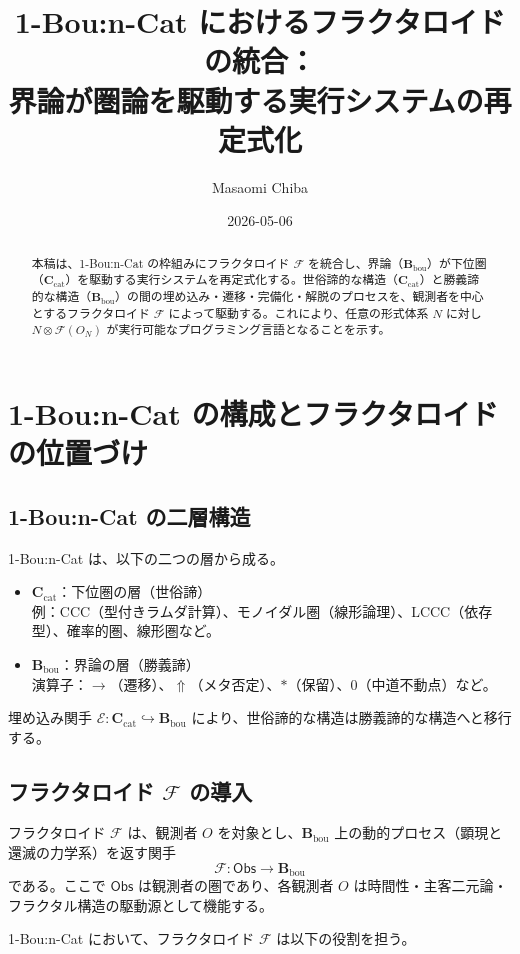 \documentclass[11pt]{article}
\title{1-Bou:n-Cat におけるフラクタロイドの統合：\\
界論が圏論を駆動する実行システムの再定式化}
\author{Masaomi Chiba}
\date{2026-05-06}
\newcommand{\Cat}{\mathbf{C}_{\mathrm{cat}}}  %
\newcommand{\Bou}{\mathbf{B}_{\mathrm{bou}}}  %
\newcommand{\Obs}{\textsf{Obs}}
\newcommand{\F}{\mathcal{F}}
\newcommand{\metanegation}{\Uparrow}
\newcommand{\E}{\mathcal{E}}
\begin{document}
\maketitle

\begin{abstract}
本稿は、1-Bou:n-Cat の枠組みにフラクタロイド $\F$ を統合し、界論（$\Bou$）が下位圏（$\Cat$）を駆動する実行システムを再定式化する。世俗諦的な構造（$\Cat$）と勝義諦的な構造（$\Bou$）の間の埋め込み・遷移・完備化・解脱のプロセスを、観測者を中心とするフラクタロイド $\F$ によって駆動する。これにより、任意の形式体系 $N$ に対し $N \otimes \F(O_N)$ が実行可能なプログラミング言語となることを示す。
\end{abstract}

\section{1-Bou:n-Cat の構成とフラクタロイドの位置づけ}

\subsection{1-Bou:n-Cat の二層構造}

1-Bou:n-Cat は、以下の二つの層から成る。

\begin{itemize}
\item $\Cat$：下位圏の層（世俗諦）\\
  例：CCC（型付きラムダ計算）、モノイダル圏（線形論理）、LCCC（依存型）、確率的圏、線形圏など。
\item $\Bou$：界論の層（勝義諦）\\
  演算子：$\to$（遷移）、$\metanegation$（メタ否定）、$*$（保留）、$0$（中道不動点）など。
\end{itemize}

埋め込み関手 $\E : \Cat \hookrightarrow \Bou$ により、世俗諦的な構造は勝義諦的な構造へと移行する。

\subsection{フラクタロイド $\F$ の導入}

フラクタロイド $\F$ は、観測者 $O$ を対象とし、$\Bou$ 上の動的プロセス（顕現と還滅の力学系）を返す関手
\[
\F : \Obs \to \Bou
\]
である。ここで $\Obs$ は観測者の圏であり、各観測者 $O$ は時間性・主客二元論・フラクタル構造の駆動源として機能する。

1-Bou:n-Cat において、フラクタロイド $\F$ は以下の役割を担う。
\end{document}
